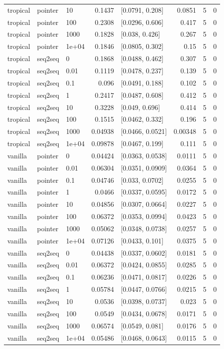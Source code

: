 \documentclass[10pt]{article}
\begin{document}
{\begin{longtable}{lllrlrrr}
tropical & pointer & 10 & 0.1437 & [0.0791, 0.208] & 0.0851 & 5 & 0\\
tropical & pointer & 100 & 0.2308 & [0.0296, 0.606] & 0.417 & 5 & 0\\
tropical & pointer & 1000 & 0.1828 & [0.038, 0.426] & 0.267 & 5 & 0\\
tropical & pointer & 1e+04 & 0.1846 & [0.0805, 0.302] & 0.15 & 5 & 0\\
tropical & seq2seq & 0 & 0.1868 & [0.0488, 0.462] & 0.307 & 5 & 0\\
tropical & seq2seq & 0.01 & 0.1119 & [0.0478, 0.237] & 0.139 & 5 & 0\\
tropical & seq2seq & 0.1 & 0.096 & [0.0491, 0.188] & 0.102 & 5 & 0\\
tropical & seq2seq & 1 & 0.2417 & [0.0487, 0.608] & 0.412 & 5 & 0\\
tropical & seq2seq & 10 & 0.3228 & [0.049, 0.696] & 0.414 & 5 & 0\\
tropical & seq2seq & 100 & 0.1515 & [0.0462, 0.332] & 0.196 & 5 & 0\\
tropical & seq2seq & 1000 & 0.04938 & [0.0466, 0.0521] & 0.00348 & 5 & 0\\
tropical & seq2seq & 1e+04 & 0.09878 & [0.0467, 0.199] & 0.111 & 5 & 0\\
vanilla & pointer & 0 & 0.04424 & [0.0363, 0.0538] & 0.0111 & 5 & 0\\
vanilla & pointer & 0.01 & 0.06304 & [0.0351, 0.0909] & 0.0364 & 5 & 0\\
vanilla & pointer & 0.1 & 0.04746 & [0.033, 0.0702] & 0.0255 & 5 & 0\\
vanilla & pointer & 1 & 0.0466 & [0.0337, 0.0595] & 0.0172 & 5 & 0\\
vanilla & pointer & 10 & 0.04856 & [0.0307, 0.0664] & 0.0227 & 5 & 0\\
vanilla & pointer & 100 & 0.06372 & [0.0353, 0.0994] & 0.0423 & 5 & 0\\
vanilla & pointer & 1000 & 0.05062 & [0.0348, 0.0738] & 0.0257 & 5 & 0\\
vanilla & pointer & 1e+04 & 0.07126 & [0.0433, 0.101] & 0.0375 & 5 & 0\\
vanilla & seq2seq & 0 & 0.04438 & [0.0337, 0.0602] & 0.0181 & 5 & 0\\
vanilla & seq2seq & 0.01 & 0.06372 & [0.0424, 0.0855] & 0.0285 & 5 & 0\\
vanilla & seq2seq & 0.1 & 0.06236 & [0.0471, 0.0817] & 0.0226 & 5 & 0\\
vanilla & seq2seq & 1 & 0.05784 & [0.0447, 0.0766] & 0.0215 & 5 & 0\\
vanilla & seq2seq & 10 & 0.0536 & [0.0398, 0.0737] & 0.023 & 5 & 0\\
vanilla & seq2seq & 100 & 0.0549 & [0.0434, 0.0678] & 0.0171 & 5 & 0\\
vanilla & seq2seq & 1000 & 0.06574 & [0.0549, 0.081] & 0.0176 & 5 & 0\\
vanilla & seq2seq & 1e+04 & 0.05486 & [0.0468, 0.0643] & 0.0115 & 5 & 0\\
\bottomrule
\end{longtable}
}
\end{document}
